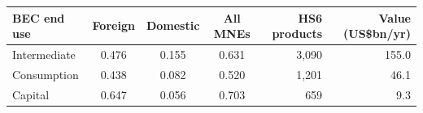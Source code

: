 \begin{tabular}{lcccrr}
\toprule
BEC end use & Foreign & Domestic & All MNEs & HS6 products & Value (US\$bn/yr) \\
\midrule
Intermediate & 0.476 & 0.155 & 0.631 & 3,090 & 155.0 \\
Consumption & 0.438 & 0.082 & 0.520 & 1,201 & 46.1 \\
Capital & 0.647 & 0.056 & 0.703 & 659 & 9.3 \\
\bottomrule
\end{tabular}
